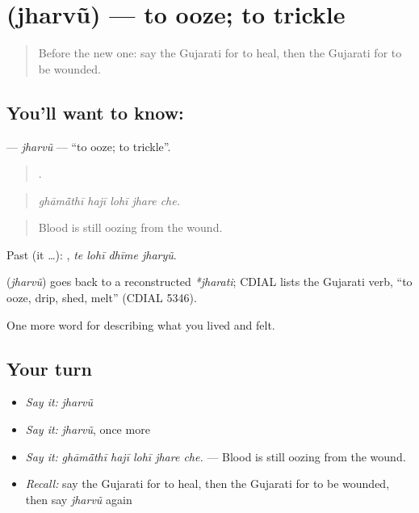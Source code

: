 \section[\texorpdfstring{\gu{ઝરવું} (jharvũ)}{ઝરવું (jharvũ)}]{ (jharvũ) — to ooze; to trickle}

\label{lesson:GU-C481-jharvu}



\begin{quote}
Before the new one: say the Gujarati for to heal, then the Gujarati for to be wounded.
\end{quote}

\subsection*{You'll want to know: }
\textbf{} — \emph{jharvũ} — \textquotedblleft{}to ooze; to trickle\textquotedblright{}.

\begin{quote}
    .
\end{quote}

\begin{quote}
\emph{ghāmā̃thī hajī lohī jhare che.}
\end{quote}

\begin{quote}
Blood is still oozing from the wound.
\end{quote}

Past (it …):    , \emph{te lohī dhīme jharyũ}.

\begin{cousinweb}
\textbf{} (\emph{jharvũ}) goes back to a reconstructed \emph{*jharati}; CDIAL lists the Gujarati verb, \textquotedblleft{}to ooze, drip, shed, melt\textquotedblright{} (CDIAL 5346).
\end{cousinweb}

\begin{grammarlens}[title={What you've built}]
One more word for describing what you lived and felt.
\end{grammarlens}

\subsection*{Your turn}
\begin{itemize}
\raggedright
  \item \emph{Say it:} \emph{jharvũ}
  \item \emph{Say it:} \emph{jharvũ}, once more
  \item \emph{Say it:} \emph{ghāmā̃thī hajī lohī jhare che.} — Blood is still oozing from the wound.
  \item \emph{Recall:} say the Gujarati for to heal, then the Gujarati for to be wounded, then say \emph{jharvũ} again
\end{itemize}

